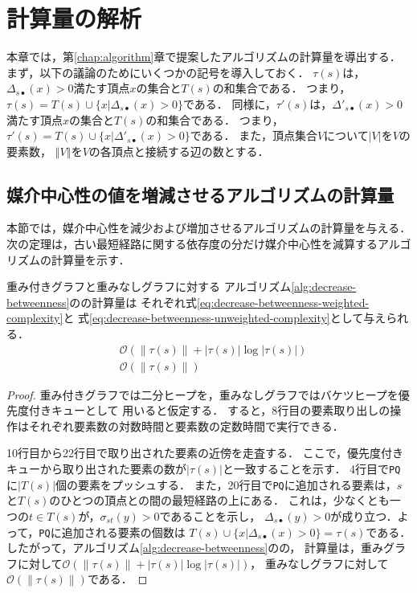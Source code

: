 \chapter{計算量の解析}
\label{chap:complexity-analysis}

本章では，第\ref{chap:algorithm}章で提案したアルゴリズムの計算量を導出する．
まず，以下の議論のためにいくつかの記号を導入しておく．
$\tau(s)$は，$\Delta_{s\bullet}(x)>0$満たす頂点$x$の集合と$T(s)$の和集合である．
つまり，$\tau(s)=T(s)\cup\{x|\Delta_{s\bullet}(x)>0\}$である．
同様に，$\tau'(s)$は，$\Delta'_{s\bullet}(x)>0$満たす頂点$x$の集合と$T(s)$の和集合である．
つまり，$\tau'(s)=T(s)\cup\{x|\Delta'_{s\bullet}(x)>0\}$である．
また，頂点集合$V$について$\left\vert V\right\vert$を$V$の要素数，
$\left\Vert V\right\Vert$を$V$の各頂点と接続する辺の数とする．

\section{媒介中心性の値を増減させるアルゴリズムの計算量}

本節では，媒介中心性を減少および増加させるアルゴリズムの計算量を与える．
次の定理は，古い最短経路に関する依存度の分だけ媒介中心性を減算するアルゴリズムの計算量を示す．

\begin{theorem}
  \label{thm:decrease-betweenness-weight-complexity}
  重み付きグラフと重みなしグラフに対する
  アルゴリズム\ref{alg:decrease-betweenness}のの計算量は
  それぞれ式\eqref{eq:decrease-betweenness-weighted-complexity}と
  式\eqref{eq:decrease-betweenness-unweighted-complexity}として与えられる．
  \begin{align}
    &\mathcal{O}\left(\left\|\tau(s)\right\|+\left|\tau(s)\right|\log\left|\tau(s)\right|\right)
    \label{eq:decrease-betweenness-weighted-complexity} \\
    &\mathcal{O}\left(\left\|\tau(s)\right\|\right)
    \label{eq:decrease-betweenness-unweighted-complexity}
  \end{align}
\end{theorem}
\begin{proof}
  重み付きグラフでは二分ヒープを，重みなしグラフではバケツヒープを優先度付きキューとして
  用いると仮定する．
  すると，8行目の要素取り出しの操作はそれぞれ要素数の対数時間と要素数の定数時間で実行できる．

  10行目から22行目で取り出された要素の近傍を走査する．
  ここで，優先度付きキューから取り出された要素の数が$|\tau(s)|$と一致することを示す．
  4行目で\texttt{PQ}に$|T(s)|$個の要素をプッシュする．
  また，20行目で\texttt{PQ}に追加される要素は，$s$と$T(s)$のひとつの頂点との間の最短経路の上にある．
  これは，少なくとも一つの$t\in T(s)$が，$\sigma_{st}(y)>0$であることを示し，
  $\Delta_{s\bullet}(y)>0$が成り立つ．よって，\texttt{PQ}に追加される要素の個数は
  $T(s)\cup\{x|\Delta_{s\bullet}(x)>0\}=\tau(s)$である．
  したがって，アルゴリズム\ref{alg:decrease-betweenness}のの，
  計算量は，重みグラフに対して$\mathcal{O}(\|\tau(s)\|+|\tau(s)|\log|\tau(s)|)$，
  重みなしグラフに対して$\mathcal{O}(\|\tau(s)\|)$である．
\end{proof}

